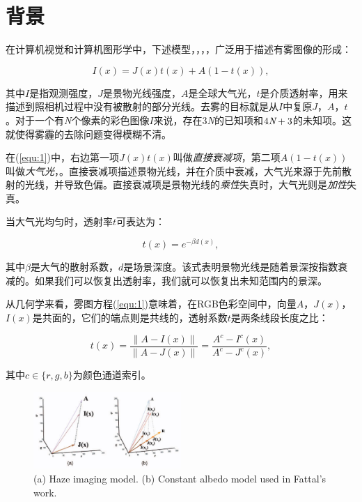 \documentclass{ctexart}
\begin{document}
\section{背景}
在计算机视觉和计算机图形学中，下述模型\cite{NarasimhanNayar2002}，\cite{NarasimhanNayar2000}，\cite{Fattal2008}，\cite{Tan2008}，广泛用于描述有雾图像的形成：

\begin{equation}\label{equ:1}
	I(x) = J(x)t(x) + A(1 - t(x)),
\end{equation}

其中$I$是指观测强度，$J$是景物光线强度，$A$是全球大气光，$t$是介质透射率，用来描述到照相机过程中没有被散射的部分光线。去雾的目标就是从$I$中复原$J$，$A$，$t$。对于一个有\emph{N}个像素的彩色图像$I$来说，存在3\emph{N}的已知项和$4\emph{N}+3$的未知项。这就使得雾霾的去除问题变得模糊不清。\par

在(\ref{equ:1})中，右边第一项$J(x)t(x)$叫做\emph{直接衰减项}\cite{Tan2008}，第二项$A(1 - t(x))$叫做\emph{大气光}\cite{Koschmieder1924}，\cite{Tan2008}。直接衰减项描述景物光线，并在介质中衰减，大气光来源于先前散射的光线，并导致色偏。直接衰减项是景物光线的\emph{乘性}失真时，大气光则是\emph{加性}失真。\par

当大气光均匀时，透射率$t$可表达为：

\begin{equation}\label{equ:2}
	t(x) = e^{-\beta d(x)},
\end{equation}

其中$\beta$是大气的散射系数，$d$是场景深度。该式表明景物光线是随着景深按指数衰减的。如果我们可以恢复出透射率，我们就可以恢复出未知范围内的景深。\par

从几何学来看，雾图方程(\ref{equ:1})意味着，在RGB色彩空间中，向量$A$，$J(x)$，$I(x)$是共面的，它们的端点则是共线的，透射系数$t$是两条线段长度之比：

\begin{equation}\label{equ:3}
	t(x) = \frac{\| A - I(x) \|}{\| A - J(x) \|} = \frac{A^c - I^c(x)}{A^c - J^c(x)},
\end{equation}

其中$c \in \{r, g, b\} $为颜色通道索引。\par

\begin{figure}[tbp]
	\centering
	\includegraphics[width=0.5\textwidth]{img/01.jpg}
	\caption{(a) Haze imaging model. (b) Constant albedo model used in Fattal’s work\cite{Fattal2008}.}\label{fig:02}
\end{figure}
\end{document}
